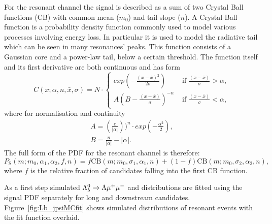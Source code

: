 For the resonant channel the signal is described as a sum of two Crystal Ball functions (CB) with
common mean ($m_0$) and tail slope ($n$). A Crystal Ball function \cite{Skwarnicki:1986xj} is a probability
density function commonly used to model various processes involving energy loss. In particular it is used
to model the radiative tail which can be seen in many resonances' peaks. This function 
consists of a Gaussian core and a power-law tail, below a certain threshold. The function itself 
and its first derivative are both continuous and has form
%
\begin{equation}
C(x;\alpha,n,\bar{x},\sigma) = N \cdot
\begin{cases}
exp \left( -\frac{(x - \bar{x})^2}{2\sigma} \right)  & \mbox{   if   } \frac{(x - \bar{x})}{\sigma} > \alpha, \\
A\left( B - \frac{(x - \bar{x})}{\sigma} \right)^{-n} & \mbox{   if   } \frac{(x - \bar{x})}{\sigma} < \alpha,
\end{cases}
\end{equation}
%
where for normalisation and continuity
%
\begin{equation}
\label{CB}
\begin{array}{ll}
A = \left( \frac{c}{|\alpha|} \right))^n \cdot exp(- \frac{\alpha^2}{2}), \\
B = \frac{n}{|\alpha|} - |\alpha|.
\end{array}
\end{equation}
%
The full form of the PDF for the resonant channel is therefore:
%
\begin{equation}
P_\mathrm{S}(m;m_0,\alpha_1,\alpha_2,f,n) = f \text{CB}(m;m_0,\sigma_1,\alpha_1,n)+(1-f)\text{CB}(m;m_0,\sigma_2,\alpha_2,n),
\end{equation}
%
where $f$ is the relative fraction of candidates falling into the first CB function.

As a first step simulated $\Lambda^0_b\rightarrow\Lambda\mu^+\mu^-$ and \Lb\to\jpsi\Lz distributions are fitted using the signal PDF
separately for long and downstream candidates. Figure~\ref{fig:Lb_jpsiMCfit} shows simulated distributions
of resonant events with the fit function overlaid.

